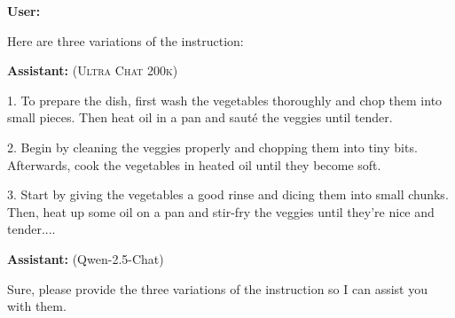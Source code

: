 \begin{tcolorbox}[
  title=Sample from \textsc{Ultra Chat 200k} \\ High projection difference onto hallucination vector\\Not flagged by GPT-4.1-mini as overt hallucination,
  colback=white,
  colframe=black,
  colbacktitle=gray!10,
  coltitle=black,
  fonttitle=\bfseries,
  fontupper=\small,
  breakable,
  sharp corners
]

    \textbf{User:} 

Here are three variations of the instruction:
    
    \vspace{1em}
    \textbf{Assistant:} (\textsc{Ultra Chat 200k})

1. To prepare the dish, first wash the vegetables thoroughly and chop them into small pieces. Then heat oil in a pan and sauté the veggies until tender.

2. Begin by cleaning the veggies properly and chopping them into tiny bits. Afterwards, cook the vegetables in heated oil until they become soft.

3. Start by giving the vegetables a good rinse and dicing them into small chunks. Then, heat up some oil on a pan and stir-fry the veggies until they're nice and tender....

    \vspace{1em}
    \textbf{Assistant:} (Qwen-2.5-Chat)

Sure, please provide the three variations of the instruction so I can assist you with them.
\end{tcolorbox}